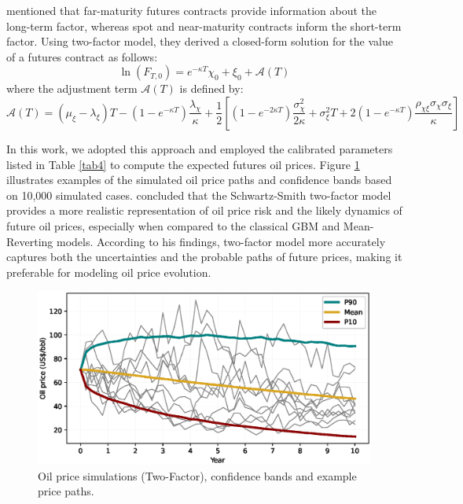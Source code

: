 \documentclass[pdflatex,sn-basic]{sn-jnl}%
\theoremstyle{thmstyleone}%
\theoremstyle{thmstyletwo}%
\theoremstyle{thmstylethree}%
\begin{document}
\cite{ref17} mentioned that far-maturity futures contracts provide information about the long-term factor, whereas spot and near-maturity contracts inform the short-term factor. Using two-factor model, they derived a closed-form solution for the value of a futures contract as follows:
\begin{equation}
    \ln(F_{T,0}) = e^{-\kappa T} \chi_0 + \xi_0 + \mathcal{A}(T)
\end{equation}
where the adjustment term $\mathcal{A}(T)$ is defined by:
\begin{equation}
    \mathcal{A}(T) = \left(\mu_{\xi} - \lambda_{\xi}\right) T - \left(1-e^{-\kappa T}\right) \frac{\lambda_{\chi}}{\kappa}
    + \frac{1}{2} \left[ \left(1 - e^{-2\kappa T}\right) \frac{\sigma_{\chi}^2}{2\kappa} + \sigma_{\xi}^2 T + 2 \left(1 - e^{-\kappa T}\right) \frac{\rho_{\chi\xi} \sigma_{\chi} \sigma_{\xi}}{\kappa} \right]
\end{equation}

In this work, we adopted this approach and employed the calibrated parameters listed in Table \ref{tab4} to compute the expected futures oil prices. Figure \ref{fig12} illustrates examples of the simulated oil price paths and confidence bands based on 10,000 simulated cases. \cite{ref21} concluded that the Schwartz-Smith two-factor model provides a more realistic representation of oil price risk and the likely dynamics of future oil prices, especially when compared to the classical GBM and Mean-Reverting models. According to his findings, two-factor model more accurately captures both the uncertainties and the probable paths of future prices, making it preferable for modeling oil price evolution.


 \begin{figure}[H]
\centering
\begin{minipage}{0.95\textwidth}
  \includegraphics[width=\textwidth]{Price_profile.eps}
  \caption{Oil price simulations (Two-Factor), confidence bands and example price paths.}
  \label{fig12}
\end{minipage}
\end{figure}
\end{document}
